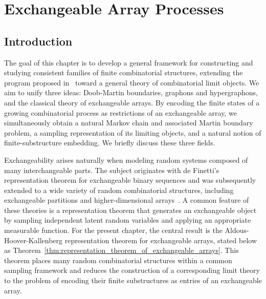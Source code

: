 \chapter{Exchangeable Array Processes}

\section{Introduction}

The goal of this chapter is to develop a general framework for constructing and studying consistent
families of finite combinatorial structures, extending the program proposed in~\cite{aldous2010_more_uses_of_exchangeability}
toward a general theory of combinatorial limit objects. We aim to unify three ideas: Doob-Martin boundaries, graphons and hypergraphons,
and the classical theory of exchangeable arrays. By encoding the finite states of a growing combinatorial process as
restrictions of an exchangeable array, we simultaneously obtain a natural Markov chain and associated Martin boundary problem,
a sampling representation of its limiting objects, and a natural notion of finite-substructure embedding. We briefly discuss these three fields.


Exchangeability arises naturally when modeling random systems composed of many interchangeable parts.
The subject originates with de Finetti’s representation theorem for exchangeable binary sequences and was
subsequently extended to a wide variety of random combinatorial structures, including exchangeable
partitions and higher-dimensional arrays~\cite{kingman1978representation,austin2013_exchangeable_random_arrays,kallenberg2005_probabilistic_symmetries}.
A common feature of these theories is a representation theorem that generates an exchangeable
object by sampling independent latent random variables and applying an appropriate measurable function.
For the present chapter, the central result is the Aldous-Hoover-Kallenberg representation theorem for
exchangeable arrays, stated below as Theorem~\ref{thm:representation_theorem_of_exchangeable_arrays}.
This theorem places many random combinatorial structures within a common sampling framework and
reduces the construction of a corresponding limit theory to the problem of encoding their
finite substructures as entries of an exchangeable array.


